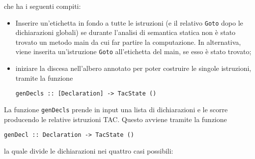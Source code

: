 che ha i seguenti compiti:
\begin{itemize}
    \item Inserire un'etichetta in fondo a tutte le istruzioni (e il relativo {\tt Goto} dopo le dichiarazioni globali) se durante l'analisi di semantica statica non è stato trovato un metodo main da cui far partire la computazione. In alternativa, viene inserita un'istruzione {\tt Goto} all'etichetta del main, se esso è stato trovato;
    \item iniziare la discesa nell'albero annotato per poter costruire le singole istruzioni, tramite la funzione 
    \begin{center}
        {\tt genDecls :: [Declaration] -> TacState ()}
    \end{center} 
\end{itemize}
La funzione {\tt genDecls} prende in input una lista di dichiarazioni e le scorre producendo le relative istruzioni TAC. Questo avviene tramite la funzione 
\begin{center}
    {\tt genDecl :: Declaration -> TacState ()}
\end{center}
la quale divide le dichiarazioni nei quattro casi possibili:
